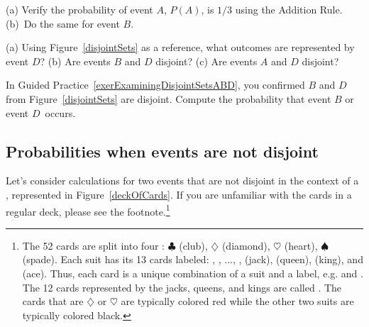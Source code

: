 \begin{exercisewrap}
\begin{nexercise}
(a) Verify the probability of event $A$, $P(A)$,
is $1/3$ using the Addition Rule.
(b)~Do the same for event $B$.\footnotemark
\end{nexercise}
\end{exercisewrap}

\begin{exercisewrap}
\begin{nexercise} \label{exerExaminingDisjointSetsABD}
(a) Using Figure~\ref{disjointSets} as a reference, what outcomes are represented by event $D$? (b) Are events $B$ and $D$ disjoint? (c) Are events $A$ and $D$ disjoint?\footnotemark
\end{nexercise}
\end{exercisewrap}

\begin{exercisewrap}
\begin{nexercise}
In Guided Practice~\ref{exerExaminingDisjointSetsABD}, you confirmed $B$ and $D$ from Figure~\ref{disjointSets} are disjoint. Compute the probability that event $B$ or event $D$~occurs.\footnotemark
\end{nexercise}
\end{exercisewrap}


\subsection{Probabilities when events are not disjoint}

Let's consider calculations for two events that are not disjoint in the context of a , represented in Figure~\ref{deckOfCards}. If you are unfamiliar with the cards in a regular deck, please see the footnote.\footnote{The 52 cards are split into four : $\clubsuit$ (club), {\color{redcards}$\diamondsuit$} (diamond), {\color{redcards}$\heartsuit$} (heart), $\spadesuit$ (spade). Each suit has its 13 cards labeled: , , ..., ,  (jack),  (queen),  (king), and  (ace). Thus, each card is a unique combination of a suit and a label, e.g. {\color{redcards}} and . The 12 cards represented by the jacks, queens, and kings are called . The cards that are {\color{redcards}$\diamondsuit$} or {\color{redcards}$\heartsuit$} are typically colored {\color{redcards}red} while the other two suits are typically colored black.}

